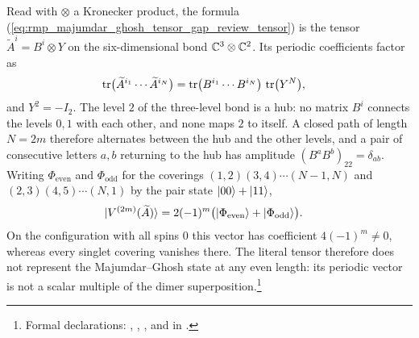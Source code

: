 \documentclass{article}
\begin{document}
Read with $\otimes$ a Kronecker product, the formula
(\ref{eq:rmp_majumdar_ghosh_tensor_gap_review_tensor}) is the tensor
$\widetilde A^i=B^i\otimes Y$ on the six-dimensional bond
$\mathbb{C}^3\otimes\mathbb{C}^2$. Its periodic coefficients factor as
\begin{align}
    \operatorname{tr}\bigl(\widetilde A^{i_1}\cdots\widetilde A^{i_N}\bigr)
        &=
        \operatorname{tr}\bigl(B^{i_1}\cdots B^{i_N}\bigr)\,\operatorname{tr}\bigl(Y^N\bigr),
    \label{eq:rmp_majumdar_ghosh_tensor_gap_literal_factorization}
\end{align}
and $Y^2=-I_2$. The level $2$ of the three-level bond is a hub: no matrix
$B^i$ connects the levels $0,1$ with each other, and none maps $2$ to itself.
A closed path of length $N=2m$ therefore alternates between the hub and the
other levels, and a pair of consecutive letters $a,b$ returning to the hub has
amplitude $(B^aB^b)_{22}=\delta_{ab}$. Writing $\Phi_{\mathrm{even}}$ and
$\Phi_{\mathrm{odd}}$ for the coverings $(1,2)(3,4)\cdots(N-1,N)$ and
$(2,3)(4,5)\cdots(N,1)$ by the pair state $|00\rangle+|11\rangle$,
\begin{align}
    |V^{(2m)}(\widetilde A)\rangle
        &=
        2(-1)^m\bigl(|\Phi_{\mathrm{even}}\rangle+|\Phi_{\mathrm{odd}}\rangle\bigr).
    \label{eq:rmp_majumdar_ghosh_tensor_gap_literal_vector}
\end{align}
On the configuration with all spins $0$ this vector has coefficient
$4(-1)^m\neq0$, whereas every singlet covering vanishes there. The literal
tensor therefore does not represent the Majumdar--Ghosh state at any even
length: its periodic vector is not a scalar multiple of the dimer
superposition.\footnote{Formal declarations: ,
,
, and
 in
.}
\end{document}

